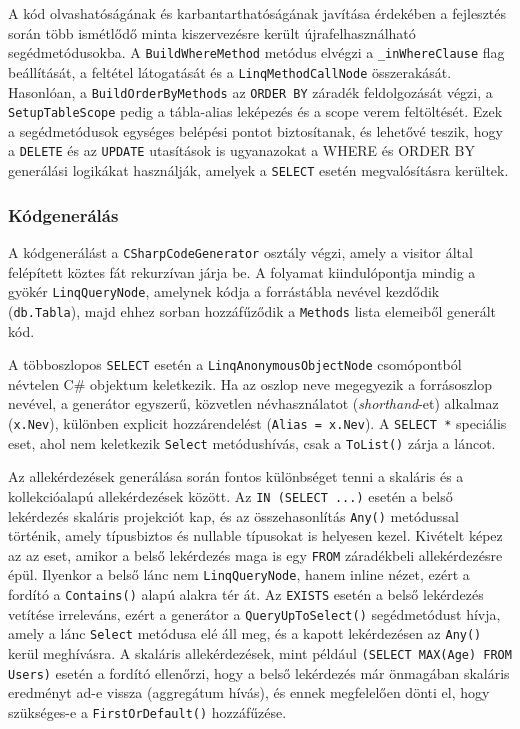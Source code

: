 \documentclass[a4paper,12pt]{article}
\begin{document}
A kód olvashatóságának és karbantarthatóságának javítása érdekében a fejlesztés során több ismétlődő minta kiszervezésre került újrafelhasználható segédmetódusokba. A \texttt{BuildWhereMethod} metódus elvégzi a \texttt{\_inWhereClause} flag beállítását, a feltétel látogatását és a \texttt{LinqMethodCallNode} összerakását. Hasonlóan, a \texttt{BuildOrderByMethods} az \texttt{ORDER BY} záradék feldolgozását végzi, a \texttt{SetupTableScope} pedig a tábla-alias leképezés és a scope verem feltöltését. Ezek a segédmetódusok egységes belépési pontot biztosítanak, és lehetővé teszik, hogy a \texttt{DELETE} és az \texttt{UPDATE} utasítások is ugyanazokat a WHERE és ORDER BY generálási logikákat használják, amelyek a \texttt{SELECT} esetén megvalósításra kerültek.

\subsubsection{Kódgenerálás}

A kódgenerálást a \texttt{CSharpCodeGenerator} osztály végzi, amely a visitor által felépített köztes fát rekurzívan járja be. A folyamat kiindulópontja mindig a gyökér \texttt{LinqQueryNode}, amelynek kódja a forrástábla nevével kezdődik (\texttt{db.Tabla}), majd ehhez sorban hozzáfűződik a \texttt{Methods} lista elemeiből generált kód.

A többoszlopos \texttt{SELECT} esetén a \texttt{LinqAnonymousObjectNode} csomópontból névtelen C\# objektum keletkezik. Ha az oszlop neve megegyezik a forrásoszlop nevével, a generátor egyszerű, közvetlen névhasználatot (\textit{shorthand}-et) alkalmaz (\texttt{x.Nev}), különben explicit hozzárendelést (\texttt{Alias = x.Nev}). A \texttt{SELECT *} speciális eset, ahol nem keletkezik \texttt{Select} metódushívás, csak a \texttt{ToList()} zárja a láncot.

Az allekérdezések generálása során fontos különbséget tenni a skaláris és a kollekcióalapú allekérdezések között. Az \texttt{IN (SELECT ...)} esetén a belső lekérdezés skaláris projekciót kap, és az összehasonlítás \texttt{Any()} metódussal történik, amely típusbiztos és nullable típusokat is helyesen kezel. Kivételt képez az az eset, amikor a belső lekérdezés maga is egy \texttt{FROM} záradékbeli allekérdezésre épül. Ilyenkor a belső lánc nem \texttt{LinqQueryNode}, hanem inline nézet, ezért a fordító a \texttt{Contains()} alapú alakra tér át. Az \texttt{EXISTS} esetén a belső lekérdezés vetítése irreleváns, ezért a generátor a \texttt{QueryUpToSelect()} segédmetódust hívja, amely a lánc \texttt{Select} metódusa elé áll meg, és a kapott lekérdezésen az \texttt{Any()} kerül meghívásra. A skaláris allekérdezések, mint például \texttt{(SELECT MAX(Age) FROM Users)} esetén a fordító ellenőrzi, hogy a belső lekérdezés már önmagában skaláris eredményt ad-e vissza (aggregátum hívás), és ennek megfelelően dönti el, hogy szükséges-e a \texttt{FirstOrDefault()} hozzáfűzése.
\end{document}

